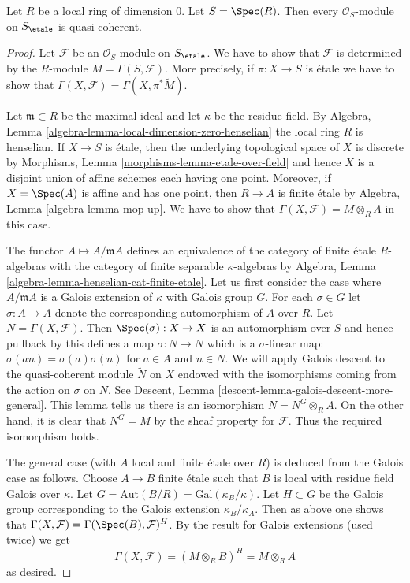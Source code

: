 \begin{lemma}
\label{lemma-all-modules-quasi-coherent}
Let $R$ be a local ring of dimension $0$. Let $S = \Spec(R)$.
Then every $\mathcal{O}_S$-module on $S_\etale$ is quasi-coherent.
\end{lemma}

\begin{proof}
Let $\mathcal{F}$ be an $\mathcal{O}_S$-module on $S_\etale$.
We have to show that $\mathcal{F}$ is determined by the
$R$-module $M = \Gamma(S, \mathcal{F})$.
More precisely, if $\pi : X \to S$ is \'etale we have to
show that $\Gamma(X, \mathcal{F}) = \Gamma(X, \pi^*\widetilde{M})$.

\medskip\noindent
Let $\mathfrak m \subset R$ be the maximal ideal and let
$\kappa$ be the residue field. By
Algebra, Lemma \ref{algebra-lemma-local-dimension-zero-henselian}
the local ring $R$ is henselian. If $X \to S$ is \'etale,
then the underlying topological space of $X$ is discrete
by Morphisms, Lemma \ref{morphisms-lemma-etale-over-field}
and hence $X$ is a disjoint union of affine schemes
each having one point. Moreover, if $X = \Spec(A)$ is affine and
has one point, then $R \to A$ is finite \'etale by
Algebra, Lemma \ref{algebra-lemma-mop-up}.
We have to show that $\Gamma(X, \mathcal{F}) = M \otimes_R A$
in this case.

\medskip\noindent
The functor $A \mapsto A/\mathfrak m A$ defines an equivalence of
the category of finite \'etale $R$-algebras
with the category of finite separable $\kappa$-algebras by
Algebra, Lemma \ref{algebra-lemma-henselian-cat-finite-etale}.
Let us first consider the case where $A/\mathfrak m A$
is a Galois extension of $\kappa$ with Galois group $G$.
For each $\sigma \in G$ let $\sigma : A \to A$ denote the
corresponding automorphism of $A$ over $R$.
Let $N = \Gamma(X, \mathcal{F})$.
Then $\Spec(\sigma) : X \to X$ is an automorphism over $S$
and hence pullback by this defines a map $\sigma : N \to N$
which is a $\sigma$-linear map: $\sigma(an) = \sigma(a) \sigma(n)$
for $a \in A$ and $n \in N$.
We will apply Galois descent to the quasi-coherent module
$\widetilde{N}$ on $X$ endowed with the isomorphisms
coming from the action on $\sigma$ on $N$. See Descent, Lemma
\ref{descent-lemma-galois-descent-more-general}.
This lemma tells us there is an isomorphism $N = N^G \otimes_R A$.
On the other hand, it is clear that $N^G = M$ by the sheaf property
for $\mathcal{F}$. Thus the required isomorphism holds.

\medskip\noindent
The general case (with $A$ local and finite \'etale over $R$)
is deduced from the Galois case as follows. Choose $A \to B$
finite \'etale such that $B$ is local with residue field
Galois over $\kappa$. Let $G = \text{Aut}(B/R) = \text{Gal}(\kappa_B/\kappa)$.
Let $H \subset G$ be the Galois group corresponding to the
Galois extension $\kappa_B/\kappa_A$. Then as above one
shows that $\Gamma(X, \mathcal{F}) = \Gamma(\Spec(B), \mathcal{F})^H$.
By the result for Galois extensions (used twice) we get
$$
\Gamma(X, \mathcal{F}) = (M \otimes_R B)^H = M \otimes_R A
$$
as desired.
\end{proof}